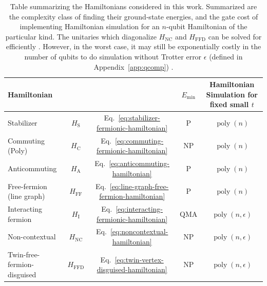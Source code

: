 \documentclass[%
 aip,
 amsmath,amssymb,
 reprint,%
]{revtex4-1}
\newcommand{\stabilizerHamiltonian}{H_{\mathrm{S}}}
\newcommand{\commutingHamiltonian}{H_{\mathrm{C}}}
\newcommand{\anticommutingHamiltonian}{H_{\mathrm{A}}}
\newcommand{\noncontextualHamiltonian}{H_{\mathrm{NC}}}
\newcommand{\lineGraphFreeFermionHamiltonian}{H_{\mathrm{FF}}}
\newcommand{\freeFermionHamiltonian}{H_{\mathrm{FFD}}}
\begin{document}
\begin{table}[t]
    \centering
    \caption{Table summarizing the Hamiltonians considered in this work. Summarized are
      the complexity class of finding their ground‑state energies, and
      the gate cost of implementing Hamiltonian simulation for an $n$-qubit Hamiltonian of the particular kind.  The unitaries
    which diagonalize $\noncontextualHamiltonian$ and $\freeFermionHamiltonian$
      can be solved for efficiently \cite{patel2023extensionexactlysolvablehamiltoniansusing}. However, %
      in the worst case, it may still be exponentially
      costly in the number of qubits 
      to do simulation without Trotter error $\epsilon$ (defined in Appendix~\ref{app:qcomp}) . }
    \label{fig:hamiltonian-table}

    \begin{tabular}{l c c c c}
        \toprule
        \textbf{Hamiltonian} &
         &
         &
        \textbf{\(E_{\min}\)} &
        \textbf{Hamiltonian Simulation for fixed small $t$} \\
        \midrule
        Stabilizer & $\stabilizerHamiltonian$ & Eq.~\eqref{eq:stabilizer-fermionic-hamiltonian} & $\mathrm{P}$ & $\operatorname{poly}(n)$ \\
        Commuting (Poly) & $\commutingHamiltonian$ & Eq.~\eqref{eq:commuting-fermionic-hamiltonian} & $\mathrm{NP}$ & $\operatorname{poly}(n)$ \\
        Anticommuting & $\anticommutingHamiltonian$ & Eq.~\eqref{eq:anticommuting-hamiltonian} & $\mathrm{P}$ & $\operatorname{poly}(n)$ \\
        Free-fermion (line graph) & $\lineGraphFreeFermionHamiltonian$ & Eq.~\eqref{eq:line-graph-free-fermion-hamiltonian} & $\mathrm{P}$ & $\operatorname{poly}(n)$ \\
        Interacting fermion & $H_{\mathrm{I}}$ & Eq.~\eqref{eq:interacting-fermionic-hamiltonian} & $\mathrm{QMA}$ & $\operatorname{poly}(n,\epsilon)$  \\
        \midrule
        Non-contextual & $\noncontextualHamiltonian$ & Eq.~\eqref{eq:noncontextual-hamiltonian} & $\mathrm{NP}$ & $\operatorname{poly}(n,\epsilon)$ \\
        Twin-free-fermion-disguised & $\freeFermionHamiltonian$ & Eq.~\eqref{eq:twin-vertex-disguised-hamiltonian} & $\mathrm{NP}$ & $\operatorname{poly}(n,\epsilon)$ \\
        \bottomrule
    \end{tabular}

\end{table}
\end{document}
